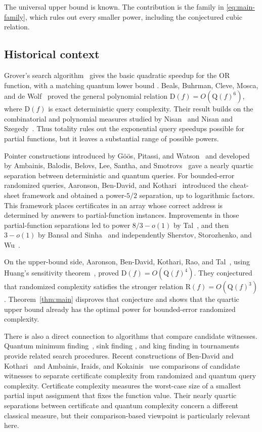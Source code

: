 \documentclass[11pt]{article}
\theoremstyle{definition}
\newcommand{\R}{\mathrm R}
\newcommand{\Q}{\mathrm Q}
\newcommand{\D}{\mathrm D}
\begin{document}
The universal upper bound is known. The contribution is the family in
\eqref{eq:main-family}, which rules out every smaller power, including
the conjectured cubic relation.

\subsection{Historical context}

Grover's search algorithm~\cite{Grover96} gives the basic quadratic
speedup for the OR function, with a matching quantum lower bound
\cite{BBBV97}. Beals, Buhrman, Cleve, Mosca, and de Wolf~\cite{BBCMW01}
proved the general polynomial relation $\D(f)=O(\Q(f)^6)$, where
$\D(f)$ is exact deterministic query complexity. Their result builds
on the combinatorial and polynomial measures studied by
Nisan~\cite{Nisan91} and Nisan and Szegedy~\cite{NisanSzegedy94}.
Thus totality rules out the exponential query speedups possible for
partial functions, but it leaves a substantial range of possible powers.

Pointer constructions introduced by G\"o\"os, Pitassi, and
Watson~\cite{GPW15} and developed by Ambainis, Balodis, Belovs, Lee,
Santha, and Smotrovs~\cite{ABBLSS17} gave a nearly quartic separation
between deterministic and quantum queries. For bounded-error randomized
queries, Aaronson, Ben-David, and Kothari~\cite{ABK16} introduced the
cheat-sheet framework and obtained a power-$5/2$ separation, up to
logarithmic factors. This framework places certificates in an array
whose correct address is determined by answers to partial-function
instances. Improvements in those partial-function separations led to
power $8/3-o(1)$ by Tal~\cite{Tal20}, and then $3-o(1)$ by Bansal
and Sinha~\cite{BS21} and independently Sherstov, Storozhenko, and
Wu~\cite{SSW23}.

On the upper-bound side, Aaronson, Ben-David, Kothari, Rao, and
Tal~\cite{ABKRT21}, using Huang's sensitivity theorem~\cite{Huang19},
proved $\D(f)=O(\Q(f)^4)$. They conjectured that randomized complexity
satisfies the stronger relation $\R(f)=O(\Q(f)^3)$
\cite[Conjecture~2]{ABKRT21}. Theorem~\ref{thm:main} disproves that
conjecture and shows that the quartic upper bound already has the
optimal power for bounded-error randomized complexity.

There is also a direct connection to algorithms that compare candidate
witnesses. Quantum minimum finding~\cite{DurrHoyer96}, sink finding
\cite{SYZ04}, and king finding in tournaments~\cite{MPS23} provide
related search procedures. Recent constructions of Ben-David and
Kothari~\cite{BK26} and Ambainis, Iraids, and Kokainis~\cite{AIK26}
use comparisons of candidate witnesses to separate certificate
complexity from randomized and quantum query complexity. Certificate
complexity measures the worst-case size of a smallest partial input
assignment that fixes the function value. Their nearly quartic
separations between certificate and quantum complexity concern a
different classical measure, but their comparison-based viewpoint is
particularly relevant here.
\end{document}
